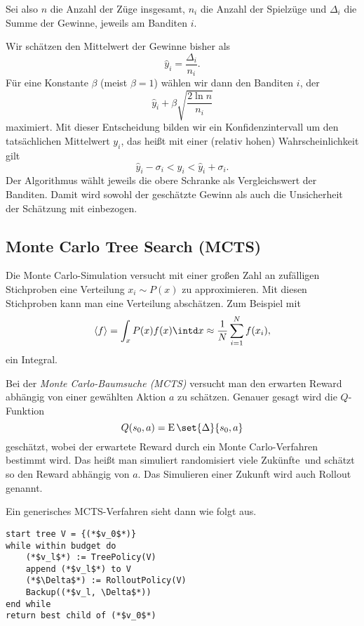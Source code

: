 \documentclass[ngerman]{../LaTeX-Templates/Paper/paper}
\newcommand{\E}{\ensuremath{\operatorname{E}}}
\begin{document}
Sei also $n$ die Anzahl der Züge insgesamt, $n_i$ die Anzahl der Spielzüge und $\Delta_i$ die Summe der Gewinne, jeweils am Banditen $i$.

Wir schätzen den Mittelwert der Gewinne bisher als
\begin{equation*}
	\hat y_i=\frac{\Delta_i}{n_i}.
\end{equation*}
Für eine Konstante $\beta$ (meist $\beta=1$) wählen wir dann den Banditen $i$, der
\begin{equation*}
	\hat y_i+\beta \sqrt{\frac{2\ln n}{n_i}}
\end{equation*}
maximiert. 
Mit dieser Entscheidung bilden wir ein Konfidenzintervall um den tatsächlichen Mittelwert $y_i$, das heißt mit einer (relativ hohen) Wahrscheinlichkeit gilt
\begin{equation*}
	\hat y_i-\sigma_i<y_i<\hat y_i+\sigma_i.
\end{equation*}
Der Algorithmus wählt jeweils die obere Schranke als Vergleichswert der Banditen. Damit wird sowohl der geschätzte Gewinn als auch die Unsicherheit der Schätzung mit einbezogen.


\subsection{Monte Carlo Tree Search (MCTS)}
Die Monte Carlo-Simulation versucht mit einer großen Zahl an zufälligen Stichproben eine Verteilung $x_i\sim P(x)$ zu approximieren. Mit diesen Stichproben kann man eine Verteilung abschätzen. Zum Beispiel mit 
\begin{equation*}
	\langle f\rangle=\int_xP(x)f(x)\intd x\approx \frac1N\sum_{i=1}^Nf(x_i),
\end{equation*}
ein Integral.

Bei der \emph{Monte Carlo-Baumsuche (MCTS)} versucht man den erwarten Reward abhängig von einer gewählten Aktion $a$ zu schätzen. Genauer gesagt wird die $Q$-Funktion 
\begin{equation*}
	Q(s_0,a)=\E\set{\Delta}{s_0,a}
\end{equation*}
geschätzt, wobei der erwartete Reward durch ein Monte Carlo-Verfahren bestimmt wird. Das heißt man simuliert randomisiert viele \glqq Zukünfte\grqq\ und schätzt so den Reward abhängig von $a$. Das Simulieren einer Zukunft wird auch Rollout genannt.

Ein generisches MCTS-Verfahren sieht dann wie folgt aus.
\begin{lstlisting}
start tree V = {(*$v_0$*)}
while within budget do
	(*$v_l$*) := TreePolicy(V)
	append (*$v_l$*) to V
	(*$\Delta$*) := RolloutPolicy(V)
	Backup((*$v_l, \Delta$*))
end while
return best child of (*$v_0$*)
\end{lstlisting}
\end{document}
